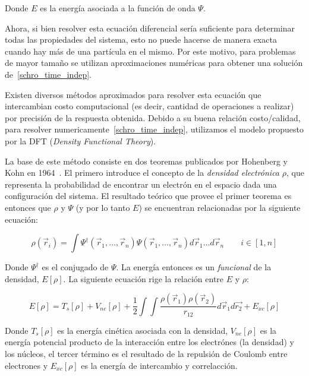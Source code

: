 Donde $E$ es la energ\'ia asociada a la funci\'on de onda $\Psi$.

Ahora, si bien resolver esta ecuaci\'on diferencial ser\'ia suficiente para determinar todas las propiedades del sistema, esto no puede hacerse de
manera exacta cuando hay m\'as de una part\'icula en el mismo. Por este motivo, para problemas de mayor tama\~no se utilizan aproximaciones num\'ericas
para obtener una soluci\'on de~\ref{schro_time_indep}.

Existen diversos m\'etodos aproximados para resolver esta ecuaci\'on que intercambian costo computacional (es decir, cantidad de operaciones a realizar)
por precisi\'on de la respuesta obtenida. Debido a su buena relaci\'on costo/calidad, para resolver numericamente~\ref{schro_time_indep}, utilizamos el modelo propuesto por la
DFT (\textit{Density Functional Theory}).

La base de este m\'etodo consiste en dos teoremas publicados por Hohenberg y Kohn en 1964~\cite{HohenbergKohn}. El primero introduce
el concepto de la \textit{densidad electr\'onica} $\rho$, que representa la probabilidad de encontrar un electr\'on en
el espacio dada una configuraci\'on del sistema. El resultado te\'orico que provee el primer teorema es entonces que
$\rho$ y $\Psi$ (y por lo tanto $E$) se encuentran relacionadas por la siguiente ecuaci\'on:

\begin{equation}
    \label{hohenberg_kohn}
    \rho(\vec{r}_i) = \int \Psi^{\dagger}(\vec{r}_1, \dots, \vec{r}_n) \Psi(\vec{r}_1, \dots, \vec{r}_n) d\vec{r}_1 \dots d\vec{r}_n \qquad i \in [1,n]
\end{equation}

Donde $\Psi^{\dagger}$ es el conjugado de $\Psi$. La energ\'ia entonces es un \textit{funcional} de la densidad, $E[\rho]$.
La siguiente ecuaci\'on rige la relaci\'on entre $E$ y $\rho$:

\begin{equation}
    \label{hohenberg_kohn_energy}
    E[\rho] = T_s[\rho] + V_{ne}[\rho] + \frac{1}{2} \int \int \frac{\rho(\vec{r}_1) \rho(\vec{r}_2)}{r_{12}} d\vec{r}_1 d\vec{r_2} + E_{xc}[\rho]
\end{equation}

Donde $T_s[\rho]$ es la energ\'ia cin\'etica asociada con la densidad, $V_{ne}[\rho]$ es la energ\'ia potencial producto de la interacci\'on entre los
electr\'ones (la densidad) y los n\'ucleos, el tercer t\'ermino es el resultado de la repulsi\'on de Coulomb entre electrones y $E_{xc}[\rho]$ es la
energ\'ia de intercambio y correlacci\'on.

